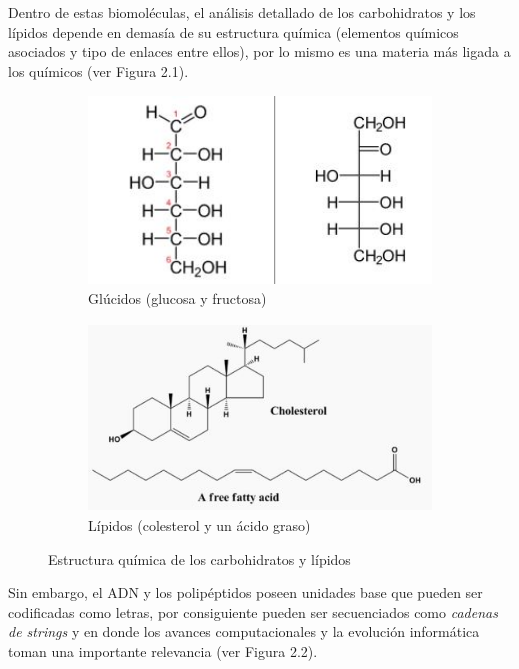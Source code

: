 Dentro de estas biomoléculas, el análisis detallado de los carbohidratos y los lípidos depende en demasía de su estructura química (elementos químicos asociados y tipo de enlaces entre ellos), por lo mismo es una materia más ligada a los químicos (ver Figura 2.1). 

\begin{figure}[H] 

\begin{subfigure}{0.5\textwidth}
\includegraphics[width=0.9\linewidth, height=5cm]{./images/glucidoejemplos} 
\caption{Glúcidos (glucosa y fructosa)}
\label{fig:subim1}
\end{subfigure}
\begin{subfigure}{0.4\textwidth}
\includegraphics[width=1\linewidth, height=5cm]{./images/lipidosejemplos}
\caption{Lípidos (colesterol y un ácido graso)}
\label{fig:subim2}
\end{subfigure}
 
\caption{Estructura química de los carbohidratos y lípidos}
\label{fig:image1}
\end{figure}

Sin embargo, el ADN y los polipéptidos poseen unidades base que pueden ser codificadas como letras, por consiguiente pueden ser secuenciados como {\it{cadenas de strings}} y en donde los avances computacionales y la evolución informática toman una importante relevancia (ver Figura 2.2).

